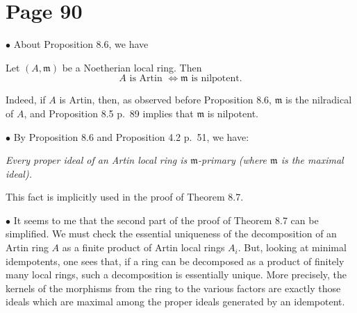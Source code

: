 \documentclass[12pt]{article}
\newcommand{\mf}{\mathfrak}
\newcommand{\bu}{\bullet}
\begin{document}
\begin{comment}
\section{Page 83, Theorem 7.13}%

Let $M$ be the set of minimal prime ideals of $A$ (see Remark~\ref{fmme} p.~\pageref{fmme}). We have 
$$
A\text{ noetherian }\implies(0)\text{ is decomposable}\implies M\text{ is finite.}
$$ 
It would be interesting to know if the implication
$$
M\text{ is finite }\implies(0)\text{ is decomposable}
$$ 
is true.
\end{comment}

\section{Page 90}%

$\bu$ About Proposition 8.6, we have 

Let $(A,\mf m)$ be a Noetherian local ring. Then
\begin{equation}\label{86}
A\text{ is Artin $\iff\mf m$ is nilpotent.}
\end{equation}

Indeed, if $A$ is Artin, then, as observed before Proposition 8.6, $\mf m$ is the nilradical of $A$, and Proposition 8.5 p.~89 implies that $\mf m$ is nilpotent. 

$\bu$ By Proposition 8.6 and Proposition 4.2 p.~51, we have:

\emph{Every proper ideal of an Artin local ring is $\mf m$-primary (where $\mf m$ is the maximal ideal).} 

This fact is implicitly used in the proof of Theorem 8.7.

$\bu$ It seems to me that the second part of the proof of Theorem 8.7 can be simplified. We must check the essential uniqueness of the decomposition of an Artin ring $A$ as a finite product of Artin local rings $A_i$. But, looking at minimal idempotents, one sees that, if a ring can be decomposed as a product of finitely many local rings, such a decomposition is essentially unique. More precisely, the kernels of the morphisms from the ring to the various factors are exactly those ideals which are maximal among the proper ideals generated by an idempotent. %
\end{document}
